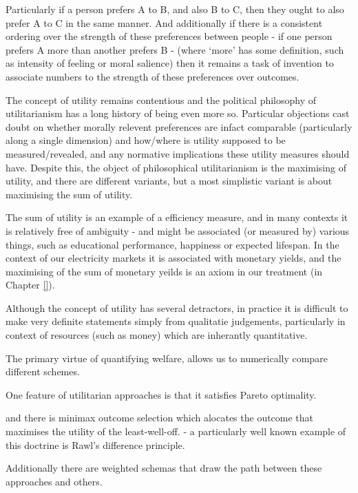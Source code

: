 Particularly if a person prefers A to B, and also B to C, then they ought to also prefer A to C in the same manner. And additionally if there is a consistent ordering over the strength of these preferences between people - if one person prefers A more than another prefers B - (where `more' has some definition, such as intensity of feeling or moral salience) then it remains a task of invention to associate numbers to the strength of these preferences over outcomes.

The concept of utility remains contentious and the political philosophy of utilitarianism has a long history of being even more so.
Particular objections cast doubt on whether morally relevent preferences are infact comparable (particularly along a single dimension) and how/where is utility supposed to be measured/revealed, and any normative implications these utility measures should have.
Despite this, the object of philosophical utilitarianism is the maximising of utility, and there are different variants, but a most simplistic variant is about maximising the sum of utility.

The sum of utility is an example of a efficiency measure, and in many contexts it is relatively free of ambiguity - and might be associated (or measured by) various things, such as educational performance, happiness or expected lifespan.
In the context of our electricity markets it is associated with monetary yields, and the maximising of the sum of monetary yeilds is an axiom in our treatment (in Chapter \ref{}).





Although the concept of utility has several detractors, in practice it is difficult to make very definite statements simply from qualitatie judgements, particularly in context of resources (such as money) which are inherantly quantitative.

The primary virtue of quantifying welfare, allows us to numerically compare different schemes.


One feature of utilitarian approaches is that it satisfies Pareto optimality.


and there is minimax outcome selection which alocates the outcome that maximises the utility of the least-well-off.
- a particularly well known example of this doctrine is Rawl's difference principle.

Additionally there are weighted schemas that draw the path between these approaches and others.

 


